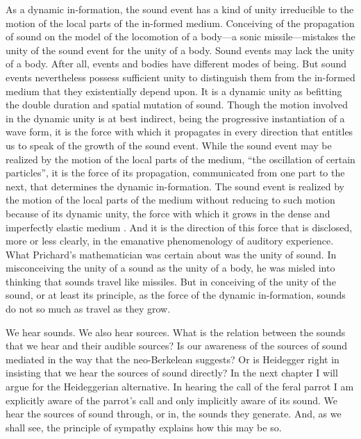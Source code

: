 As a dynamic in-formation, the sound event has a kind of unity irreducible to the motion of the local parts of the in-formed medium. Conceiving of the propagation of sound on the model of the locomotion of a body---a sonic missile---mistakes the unity of the sound event for the unity of a body. Sound events may lack the unity of a body. After all, events and bodies have different modes of being. But sound events nevertheless possess sufficient unity to distinguish them from the in-formed medium that they existentially depend upon. It is a dynamic unity as befitting the double duration and spatial mutation of sound. Though the motion involved in the dynamic unity is at best indirect, being the progressive instantiation of a wave form, it is the force with which it propagates in every direction that entitles us to speak of the growth of the sound event.  While the sound event may be realized by the motion of the local parts of the medium, ``the oscillation of certain particles'', it is the force of its propagation, communicated from one part to the next, that determines the dynamic in-formation. The sound event is realized by the motion of the local parts of the medium without reducing to such motion because of its dynamic unity, the force with which it grows in the dense and imperfectly elastic medium \citep[on dynamic principles of unity see][]{Johnston:2006js}. And it is the direction of this force that is disclosed, more or less clearly, in the emanative phenomenology of auditory experience. What Prichard's mathematician was certain about was the unity of sound. In misconceiving the unity of a sound as the unity of a body, he was misled into thinking that sounds travel like missiles. But in conceiving of the unity of the sound, or at least its principle, as the force of the dynamic in-formation, sounds do not so much as travel as they grow.

We hear sounds. We also hear sources. What is the relation between the sounds that we hear and their audible sources? Is our awareness of the sources of sound mediated in the way that the neo-Berkelean suggests? Or is Heidegger right in insisting that we hear the sources of sound directly? In the next chapter I will argue for the Heideggerian alternative. In hearing the call of the feral parrot I am explicitly aware of the parrot's call and only implicitly aware of its sound. We hear the sources of sound through, or in, the sounds they generate. And, as we shall see, the principle of sympathy explains how this may be so.


